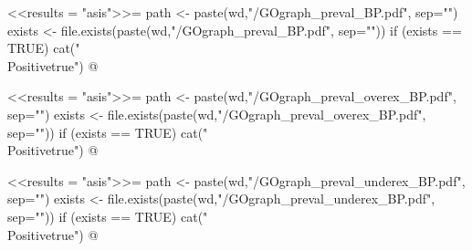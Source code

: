 \documentclass{article}
\begin{document}
\newif\ifPositive

<<results = "asis">>=
path <- paste(wd,"/GOgraph_preval_BP.pdf", sep="")
exists <- file.exists(paste(wd,"/GOgraph_preval_BP.pdf", sep=""))
if (exists == TRUE) {
  cat("\\Positivetrue")
}
@

\ifPositive
 \section{GO graphs of prevalent DEGs - Biological Process (BP))}
  \subsection{General GOgraph from prevalent DEGs}
  This is the GO graph concerning the prevalent DEGs (Image extracted from {\bf"GOgraph\_preval\_BP.pdf"} file):
  \begin{center}
    \texttt{[image: \\Sexpr\{path]}}
  \end{center}
\fi



\newif\ifPositive

<<results = "asis">>=
path <- paste(wd,"/GOgraph_preval_overex_BP.pdf", sep="")
exists <- file.exists(paste(wd,"/GOgraph_preval_overex_BP.pdf", sep=""))
if (exists == TRUE) {
  cat("\\Positivetrue")
}
@

\ifPositive
  \subsection{GOgraphs showing overexpressed functions from prevalent DEGs}
  This is the GO graph concerning the overexpressed prevalent DEGs (Image extracted from {\bf"GOgraph\_preval\_overex\_BP.pdf"} file):
  \begin{center}
    \texttt{[image: \\Sexpr\{path]}}
  \end{center}
\fi


\newif\ifPositive

<<results = "asis">>=
path <- paste(wd,"/GOgraph_preval_underex_BP.pdf", sep="")
exists <- file.exists(paste(wd,"/GOgraph_preval_underex_BP.pdf", sep=""))
if (exists == TRUE) {
  cat("\\Positivetrue")
}
@

\ifPositive
  \subsection{GOgraphs showing underexpressed functions from prevalent DEGs}
  This is the GO graph concerning the underexpressed prevalent DEGs (Image extracted from {\bf"GOgraph\_preval\_underex\_BP.pdf"} file):
  \begin{center}
    \texttt{[image: \\Sexpr\{path]}}
  \end{center}
\fi
\end{document}
